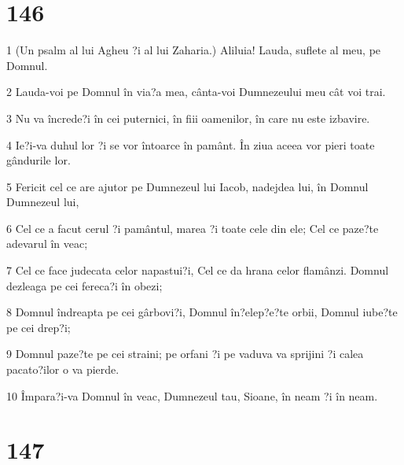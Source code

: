 \chapter{146}

\par 1 (Un psalm al lui Agheu ?i al lui Zaharia.) Aliluia! Lauda, suflete al meu, pe Domnul.
\par 2 Lauda-voi pe Domnul în via?a mea, cânta-voi Dumnezeului meu cât voi trai.
\par 3 Nu va încrede?i în cei puternici, în fiii oamenilor, în care nu este izbavire.
\par 4 Ie?i-va duhul lor ?i se vor întoarce în pamânt. În ziua aceea vor pieri toate gândurile lor.
\par 5 Fericit cel ce are ajutor pe Dumnezeul lui Iacob, nadejdea lui, în Domnul Dumnezeul lui,
\par 6 Cel ce a facut cerul ?i pamântul, marea ?i toate cele din ele; Cel ce paze?te adevarul în veac;
\par 7 Cel ce face judecata celor napastui?i, Cel ce da hrana celor flamânzi. Domnul dezleaga pe cei fereca?i în obezi;
\par 8 Domnul îndreapta pe cei gârbovi?i, Domnul în?elep?e?te orbii, Domnul iube?te pe cei drep?i;
\par 9 Domnul paze?te pe cei straini; pe orfani ?i pe vaduva va sprijini ?i calea pacato?ilor o va pierde.
\par 10 Împara?i-va Domnul în veac, Dumnezeul tau, Sioane, în neam ?i în neam.

\chapter{147}


